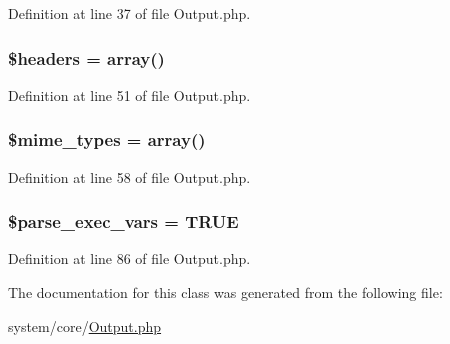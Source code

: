 Definition at line 37 of file Output.\-php.

\hypertarget{class_c_i___output_a52500036ee807241b8b4b7e2367c49ef}{
\subsubsection[{\$headers}]{\setlength{\rightskip}{0pt plus 5cm}\$headers = array()\hspace{0.3cm}{\ttfamily [protected]}}}\label{class_c_i___output_a52500036ee807241b8b4b7e2367c49ef}


Definition at line 51 of file Output.\-php.

\hypertarget{class_c_i___output_a49932ececf6da03a6379ca46ca1604d4}{
\subsubsection[{\$mime\-\_\-types}]{\setlength{\rightskip}{0pt plus 5cm}\$mime\-\_\-types = array()\hspace{0.3cm}{\ttfamily [protected]}}}\label{class_c_i___output_a49932ececf6da03a6379ca46ca1604d4}


Definition at line 58 of file Output.\-php.

\hypertarget{class_c_i___output_a254d73d122352494697cdba0c509086d}{
\subsubsection[{\$parse\-\_\-exec\-\_\-vars}]{\setlength{\rightskip}{0pt plus 5cm}\$parse\-\_\-exec\-\_\-vars = T\-R\-U\-E\hspace{0.3cm}{\ttfamily [protected]}}}\label{class_c_i___output_a254d73d122352494697cdba0c509086d}


Definition at line 86 of file Output.\-php.



The documentation for this class was generated from the following file\-:\begin{DoxyCompactItemize}
\item 
system/core/\hyperlink{_output_8php}{Output.\-php}\end{DoxyCompactItemize}
